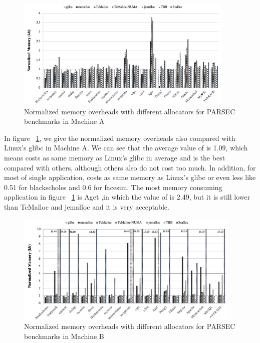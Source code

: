 \begin{figure}[H]
    \centering
    \includegraphics[width=\textwidth,height=200]{figure/2-node-parsec-mem.png}
    \caption{Normalized memory overheads with different allocators for PARSEC benchmarks in Machine A}
    \label{2node-parsec-mem}
\end{figure}

In figure ~\ref{2node-parsec-mem}, we give the normalized memory overheads also compared with Linux's glibc in Machine A. We can see that the average value of \NM{} is 1.09, which means \NM{} costs as same memory as Linux's glibc in average and \NM{} is the best compared with others, although others also do not cost too much. In addition, for most of single application, \NM{} costs as same memory as Linux's glibc or even less like 0.51 for blackscholes and 0.6 for facesim. The most memory consuming application in figure ~\ref{2node-parsec-mem} is Aget ,in which the value of \NM{} is 2.49, but it is still lower than TcMalloc and jemalloc and it is very acceptable. 

\begin{figure}[H]
    \centering
    \includegraphics[width=\textwidth,height=200]{figure/8-node-parsec-mem.png}
    \caption{Normalized memory overheads with different allocators for PARSEC benchmarks in Machine B}
    \label{8node-parsec-mem}
\end{figure}

